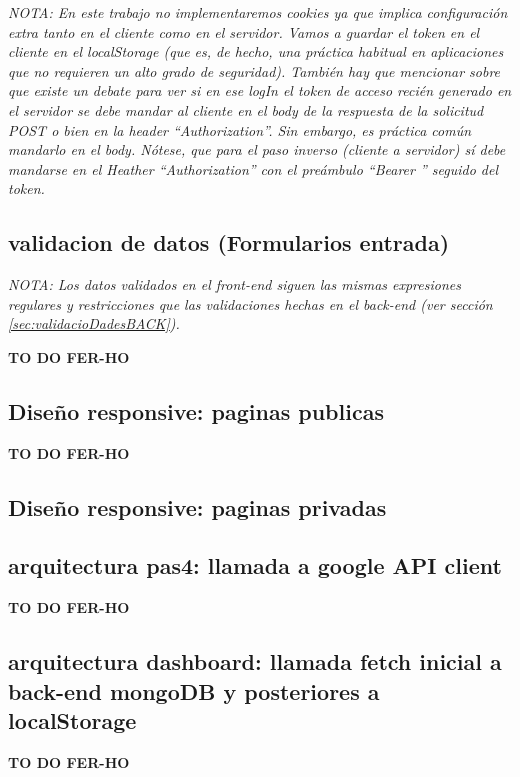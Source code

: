 \documentclass[a4paper,12pt]{report}
\begin{document}
	
	
\textit{NOTA: En este trabajo no implementaremos cookies ya que implica configuración extra tanto en el cliente como en el servidor. Vamos a guardar el token en el cliente en el localStorage (que es, de hecho, una práctica habitual en aplicaciones que no requieren un alto grado de seguridad). También hay que mencionar sobre que existe un debate para ver si en ese logIn el token de acceso recién generado en el servidor se debe mandar al cliente en el body de la respuesta de la solicitud POST \textit{o bien} en la header ``Authorization''. Sin embargo, es práctica común mandarlo en el body. Nótese, que para el paso inverso (cliente a servidor) sí debe mandarse en el Heather ``Authorization'' con el preámbulo ``Bearer '' seguido del token. }
	
	
	
	\subsection{validacion de datos (Formularios entrada)}
	\label{sec:validacioDadesFRONT}
	
	\textit{NOTA: Los datos validados en el front-end siguen las mismas expresiones regulares y restricciones que las validaciones hechas en el back-end (ver sección \ref{sec:validacioDadesBACK}).}
	
	\textbf{TO DO FER-HO}
	
	\subsection{Diseño responsive: paginas publicas}
	\label{sec:disenyoResponsivePublicas}
	\textbf{TO DO FER-HO}
	
	\subsection{Diseño responsive: paginas privadas}
	\label{sec:disenyoResponsivePrivadas}
	
	
	\subsection{arquitectura pas4: llamada a google API client}
	\label{sec:pas4googleAPIclient}
	\textbf{TO DO FER-HO}
	
	\subsection{arquitectura dashboard: llamada fetch inicial a back-end mongoDB y posteriores a localStorage}
	\label{sec:dashboardFetchLocalStorage}
	\textbf{TO DO FER-HO}
	
\end{document}
